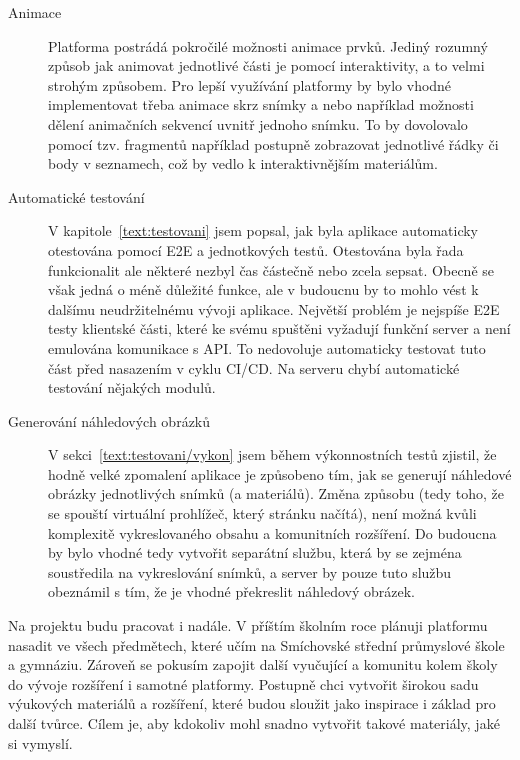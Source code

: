 \begin{description}
  \item[Animace] Platforma postrádá pokročilé možnosti animace prvků.
  Jediný rozumný způsob jak animovat jednotlivé části je pomocí interaktivity, a to velmi strohým způsobem.
  Pro lepší využívání platformy by bylo vhodné implementovat třeba animace skrz snímky a nebo například možnosti dělení animačních sekvencí uvnitř jednoho snímku.
  To by dovolovalo pomocí tzv. fragmentů například postupně zobrazovat jednotlivé řádky či body v seznamech, což by vedlo k interaktivnějším materiálům.

  \item[Automatické testování] V kapitole~\ref{text:testovani} jsem popsal, jak byla aplikace automaticky otestována pomocí E2E a jednotkových testů. 
  Otestována byla řada funkcionalit ale některé nezbyl čas částečně nebo zcela sepsat.
  Obecně se však jedná o méně důležité funkce, ale v budoucnu by to mohlo vést k dalšímu neudržitelnému vývoji aplikace.
  Největší problém je nejspíše E2E testy klientské části, které ke svému spuštěni vyžadují funkční server a není emulována komunikace s API.
  To nedovoluje automaticky testovat tuto část před nasazením v cyklu CI/CD.
  Na serveru chybí automatické testování nějakých modulů.

  \item[Generování náhledových obrázků] V sekci~\ref{text:testovani/vykon} jsem během výkonnostních testů zjistil, že hodně velké zpomalení aplikace je způsobeno tím, jak se generují náhledové obrázky jednotlivých snímků (a materiálů).
  Změna způsobu (tedy toho, že se spouští virtuální prohlížeč, který stránku načítá), není možná kvůli komplexitě vykreslovaného obsahu a komunitních rozšíření.
  Do budoucna by bylo vhodné tedy vytvořit separátní službu, která by se zejména soustředila na vykreslování snímků, a server by pouze tuto službu obeznámil s tím, že je vhodné překreslit náhledový obrázek.
\end{description}

Na projektu budu pracovat i nadále. 
V příštím školním roce plánuji platformu nasadit ve všech předmětech, které učím na Smíchovské střední průmyslové škole a gymnáziu.
Zároveň se pokusím zapojit další vyučující a komunitu kolem školy do vývoje rozšíření i samotné platformy.
Postupně chci vytvořit širokou sadu výukových materiálů a rozšíření, které budou sloužit jako inspirace i základ pro další tvůrce. 
Cílem je, aby kdokoliv mohl snadno vytvořit takové materiály, jaké si vymyslí.
